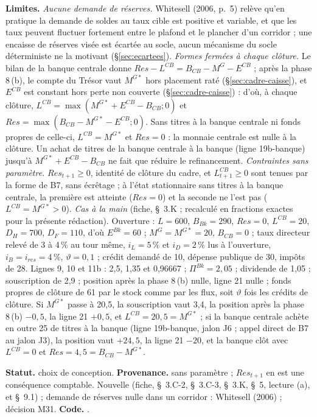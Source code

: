 \documentclass[11pt,a4paper]{article}
\newcommand{\limites}{\par\noindent\textbf{Limites.} }
\newcommand{\code}[1]{\texttt{\detokenize{#1}}}
\newcommand{\tracabilite}[3]{\par\smallskip\noindent\textbf{Statut.} #1. \textbf{Provenance.} #2. \textbf{Code.} \code{#3}.}
\begin{document}
\begin{proposee}
\begin{lecture}
\limites \emph{Aucune demande de réserves.} Whitesell (2006, p.~5) relève qu'en pratique la demande de soldes au taux cible est positive et variable, et que les taux peuvent fluctuer fortement entre le plafond et le plancher d'un corridor ; une encaisse de réserves visée est écartée au socle, aucun mécanisme du socle déterministe ne la motivant (\S\ref{sec:ecartees}). \emph{Formes fermées à chaque clôture.} Le bilan de la banque centrale donne $\mathit{Res} - L^{\mathit{CB}} = B_{\mathit{CB}} - M^G - E^{\mathit{CB}}$ ; après la phase 8\,(b), le compte du Trésor vaut $M^{G*}$ hors placement raté (\S\ref{sec:cadre-caisse}), et $E^{\mathit{CB}}$ est constant hors perte non couverte (\S\ref{sec:cadre-caisse}) : d'où, à chaque clôture, $L^{\mathit{CB}} = \max(M^{G*} + E^{\mathit{CB}} - B_{\mathit{CB}} ; 0)$ et $\mathit{Res} = \max(B_{\mathit{CB}} - M^{G*} - E^{\mathit{CB}} ; 0)$. Sans titres à la banque centrale ni fonds propres de celle-ci, $L^{\mathit{CB}} = M^{G*}$ et $\mathit{Res} = 0$ : la monnaie centrale est nulle à la clôture. Un achat de titres de la banque centrale à la banque (ligne 19b-banque) jusqu'à $M^{G*} + E^{\mathit{CB}} - B_{\mathit{CB}}$ ne fait que réduire le refinancement. \emph{Contraintes sans paramètre.} $\mathit{Res}_{t+1} \ge 0$, identité de clôture du cadre, et $L^{\mathit{CB}}_{t+1} \ge 0$ sont tenues par la forme de B7, sans écrêtage ; à l'état stationnaire sans titres à la banque centrale, la première est atteinte ($\mathit{Res} = 0$) et la seconde ne l'est pas ($L^{\mathit{CB}} = M^{G*} > 0$). \emph{Cas à la main} (fiche, \S~3.K ; recalculé en fractions exactes pour la présente rédaction). Ouverture : $L = 600$, $B_{\mathit{Bk}} = 290$, $\mathit{Res} = 0$, $L^{\mathit{CB}} = 20$, $D_H = 700$, $D_F = 110$, d'où $E^{\mathit{Bk}} = 60$ ; $M^G = M^{G*} = 20$, $B_{\mathit{CB}} = 0$ ; taux directeur relevé de 3 à 4\,\% au tour même, $i_L = 5\,\%$ et $i_D = 2\,\%$ lus à l'ouverture, $i_B = i_{\mathit{res}} = 4\,\%$, $\vartheta = 0{,}1$ ; crédit demandé de 10, dépense publique de 30, impôts de 28. Lignes 9, 10 et 11b : 2,5, 1,35 et 0,96667 ; $\Pi^{\mathit{Bk}} = 2{,}05$ ; dividende de 1,05 ; souscription de 2,9 ; position après la phase 8\,(b) nulle, ligne 21 nulle ; fonds propres de clôture de 61 par le stock comme par les flux, soit $\vartheta$ fois les crédits de clôture. Si $M^{G*}$ passe à 20,5, la souscription vaut 3,4, la position après la phase 8\,(b) $-0{,}5$, la ligne 21 $+0{,}5$, et $L^{\mathit{CB}} = 20{,}5 = M^{G*}$ ; si la banque centrale achète en outre 25 de titres à la banque (ligne 19b-banque, jalon J6 ; appel direct de B7 au jalon J3), la position vaut $+24{,}5$, la ligne 21 $-20$, et la banque clôt avec $L^{\mathit{CB}} = 0$ et $\mathit{Res} = 4{,}5 = B_{\mathit{CB}} - M^{G*}$.
\tracabilite{choix de conception}{sans paramètre ; $\mathit{Res}_{t+1}$ en est une conséquence comptable. Nouvelle (fiche, \S~3.C-2, \S~3.C-3, \S~3.K, \S~5, lecture (a), et \S~9.1) ; demande de réserves nulle dans un corridor : Whitesell (2006) ; décision M31}{nations.blocs.banque.refinancement}
\end{lecture}
\end{proposee}
\end{document}
